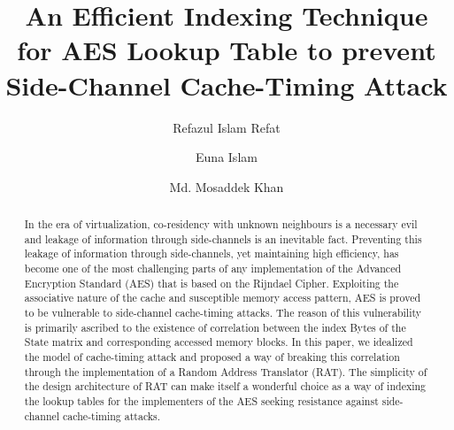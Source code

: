 \documentclass[3p]{elsarticle}
\begin{document}
\begin{frontmatter}

\title{An Efficient Indexing Technique for AES Lookup Table to prevent Side-Channel Cache-Timing Attack}







\author[label1]{Refazul Islam Refat}
 \author[label1]{Euna Islam}
 \author[label1]{Md. Mosaddek Khan\corref{*}}


 \address[label1]{Department of Computer Science and Engineering, University of Dhaka, Bangladesh}


\begin{abstract}
In the era of virtualization, co-residency with unknown neighbours is a necessary evil and leakage of information through side-channels is an inevitable fact. Preventing this leakage of information through side-channels, yet maintaining high efficiency, has become one of the most challenging parts of any implementation of the Advanced Encryption Standard (AES) that is based on the Rijndael Cipher. Exploiting the associative nature of the cache and susceptible memory access pattern, AES is proved to be vulnerable to side-channel cache-timing attacks. The reason of this vulnerability is primarily ascribed to  the existence of correlation between the index Bytes of the State matrix and corresponding accessed memory blocks. In this paper, we idealized the model of cache-timing attack and proposed a way of breaking this correlation through the implementation of a Random Address Translator (RAT). The simplicity of the design architecture of RAT can make itself a wonderful choice as a way of indexing the lookup tables for the implementers of the AES seeking resistance against side-channel cache-timing attacks.
\end{abstract}


\end{frontmatter}
\end{document}
